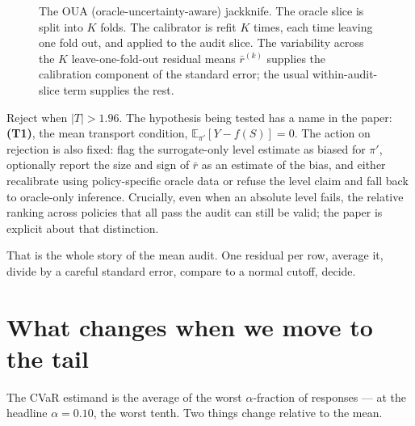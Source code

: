 \documentclass[11pt]{article}
\newcommand{\E}{\mathbb{E}}
\newcommand{\pprime}{\pi'}
\begin{document}
\begin{figure}[h]
\caption{The OUA (oracle-uncertainty-aware) jackknife. The oracle slice is split into $K$ folds. The calibrator is refit $K$ times, each time leaving one fold out, and applied to the audit slice. The variability across the $K$ leave-one-fold-out residual means $\bar r^{(k)}$ supplies the calibration component of the standard error; the usual within-audit-slice term supplies the rest.}
\label{fig:oua}
\end{figure}

Reject when $|T| > 1.96$. The hypothesis being tested has a name in the paper: \textbf{(T1)}, the mean transport condition, $\E_{\pprime}[Y - f(S)] = 0$. The action on rejection is also fixed: flag the surrogate-only level estimate as biased for $\pprime$, optionally report the size and sign of $\bar r$ as an estimate of the bias, and either recalibrate using policy-specific oracle data or refuse the level claim and fall back to oracle-only inference. Crucially, even when an absolute level fails, the relative ranking across policies that all pass the audit can still be valid; the paper is explicit about that distinction.

That is the whole story of the mean audit. One residual per row, average it, divide by a careful standard error, compare to a normal cutoff, decide.

\section*{What changes when we move to the tail}

The CVaR estimand is the average of the worst $\alpha$-fraction of responses --- at the headline $\alpha = 0.10$, the worst tenth. Two things change relative to the mean.
\end{document}
